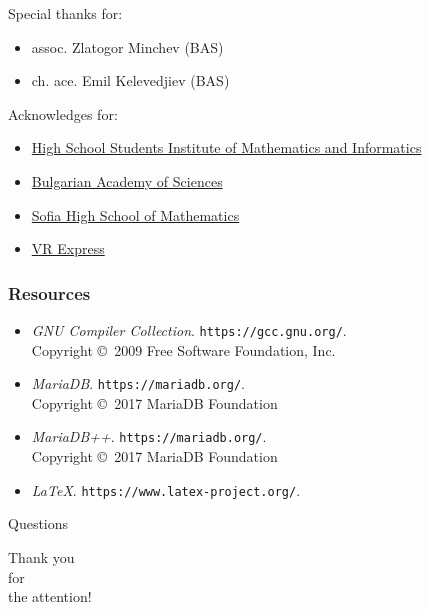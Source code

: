 \documentclass[12pt]{beamer}
\begin{document}
	\begin{frame}
		Special thanks for:
		\begin{itemize}
			\item assoc. Zlatogor Minchev (BAS)
			\item ch. ace. Emil Kelevedjiev (BAS)
		\end{itemize}
		\vspace{0.5cm}
		Acknowledges for:
		\begin{itemize}
			\item \href{http://www.math.bas.bg/omi/hssimi/}{High School Students Institute of Mathematics and Informatics}
			\item \href{http://www.math.bas.bg/}{Bulgarian Academy of Sciences}
			\item \href{http://www.smg.bg}{Sofia High School of Mathematics}
			\item \href{https://www.vrexpress.bg/}{VR Express}
		\end{itemize}
	\end{frame}
	
	\begin{frame}
	\frametitle{Resources}
		\begin{itemize}
			\item%
			{\itshape GNU Compiler Collection}.
			\texttt{https://gcc.gnu.org/}. \\
			Copyright \copyright\  2009 Free Software Foundation, Inc.
			\item%
			{\itshape MariaDB}.
			\texttt{https://mariadb.org/}. \\
			Copyright \copyright\  2017 MariaDB Foundation
			\item%
			{\itshape MariaDB++}.
			\texttt{https://mariadb.org/}. \\
			Copyright \copyright\  2017 MariaDB Foundation
			\item%
			{\itshape \LaTeX}.
			\texttt{https://www.latex-project.org/}.
		\end{itemize}
	\end{frame}
	
	\begin{frame}
	\begin{center}
	{\Huge Questions}
	\end{center}
	\end{frame}
	
	\begin{frame}
	\begin{center}
	{\Huge Thank you\\for\\the attention!}
	\end{center}
	\end{frame}
\end{document}
